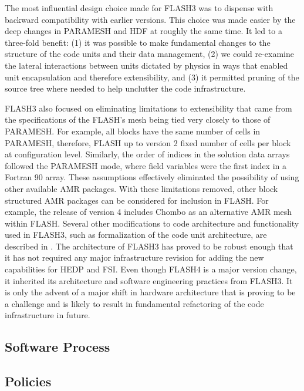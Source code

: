The most influential design choice made for FLASH3 was to dispense
with backward compatibility with earlier versions. This choice was
made easier by the deep changes in PARAMESH and HDF at roughly the
same time. It led to a three-fold benefit: (1) it was possible to make
fundamental changes to the structure of the code units and their data
management, (2) we could re-examine the lateral interactions between
units dictated by physics in ways that enabled unit encapsulation and
therefore extensibility, and (3) it permitted pruning of the source tree
where needed to help unclutter the code infrastructure. 

FLASH3 also focused on eliminating limitations to extensibility that
came from  the specifications of the FLASH's mesh being tied very
closely to those of PARAMESH. For example, all blocks have the same
number of cells in PARAMESH, therefore, FLASH up to version 2 fixed
number of cells per block at configuration
level. Similarly, the order of indices in the solution data arrays
followed the PARAMESH mode, where field variables were the first index
in a Fortran 90 array. These assumptions effectively eliminated
the possibility of using other available AMR packages. 
With these limitations removed, other block structured AMR packages
can be considered for inclusion in FLASH. For example, 
the release of version 4 includes Chombo \citep{Chombo2009} as an
alternative AMR mesh within FLASH. Several other modifications
to code architecture and functionality used in FLASH3, 
such as formalization of the code unit architecture, are described in
\citet{Dubey2009}.  The architecture of FLASH3 has proved to be robust
enough that it has not required any major infrastructure revision for
adding the new capabilities for HEDP and FSI. Even though FLASH4 is a
major version change, it inherited its architecture and software
engineering practices from FLASH3. It is only the advent of a major
shift in hardware architecture that is proving to be a challenge and
is likely to result in fundamental refactoring of the code
infrastructure in future.

\subsection{Software Process}
\subsection{Policies}